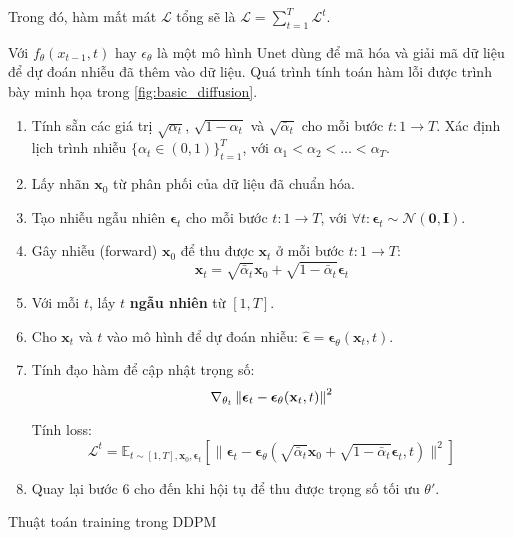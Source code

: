 Trong đó, hàm mất mát $\mathcal{L}$ tổng sẽ là  $\mathcal{L} = \sum_{t=1}^{T} \mathcal{L}^t$.

Với $f_{\theta}(x_{t-1}, t)$ hay $\epsilon_\theta$ là một mô hình Unet dùng để mã hóa và giải mã dữ liệu để dự đoán nhiễu đã thêm vào dữ liệu. Quá trình tính toán hàm lỗi được trình bày minh họa trong \autoref{fig:basic_diffusion}.


\begin{algorithm}[H]
	
	\setlength{\baselineskip}{10pt}
	\begin{enumerate}
		\vspace{5pt}
		\item Tính sẵn các giá trị $\sqrt{\alpha_t}$, $\sqrt{1 - \alpha_t}$ và $\sqrt{\bar{\alpha}_t}$ cho mỗi bước $t: 1 \rightarrow T$. Xác định lịch trình nhiễu $\{\alpha_t \in (0, 1)\}_{t=1}^T$, với $\alpha_1 < \alpha_2 < \dots < \alpha_T$.
		
		\item Lấy nhãn $\mathbf{x}_0$ từ phân phối của dữ liệu đã chuẩn hóa.
		
		\item Tạo nhiễu ngẫu nhiên $\boldsymbol{\epsilon}_t$ cho mỗi bước $t: 1 \rightarrow T$, với $\forall t: \boldsymbol{\epsilon}_t \sim \mathcal{N}(\mathbf{0}, \mathbf{I})$.
		
		\item Gây nhiễu (forward) $\mathbf{x}_0$ để thu được $\mathbf{x}_t$ ở mỗi bước $t: 1 \rightarrow T$:
		$$
		\mathbf{x}_t = \sqrt{\bar{\alpha}_t} \mathbf{x}_0 + \sqrt{1 - \bar{\alpha}_t} \boldsymbol{\epsilon}_t
		$$
		
		\item Với mỗi $t$, lấy $t$ \textbf{ngẫu nhiên} từ $[1, T]$.
		
		\item Cho $\mathbf{x}_t$ và $t$ vào mô hình để dự đoán nhiễu: $\hat{\boldsymbol{\epsilon}} = \boldsymbol{\epsilon}_\theta(\mathbf{x}_t, t)$.
		
		\item Tính đạo hàm để cập nhật trọng số:
		$$
		\nabla_{\theta_t} \left\| \boldsymbol{\epsilon}_t - \boldsymbol{\epsilon}_\theta(\mathbf{x}_t, t) \right\|^2
		$$
		
		Tính loss:
		$$
		\mathcal{L}^t = \mathbb{E}_{t \sim [1, T], \mathbf{x}_0, \boldsymbol{\epsilon}_t} \left[ \|\boldsymbol{\epsilon}_t - \boldsymbol{\epsilon}_\theta(\sqrt{\bar{\alpha}_t} \mathbf{x}_0 + \sqrt{1 - \bar{\alpha}_t} \boldsymbol{\epsilon}_t, t)\|^2 \right]
		$$
		
		\item Quay lại bước 6 cho đến khi hội tụ để thu được trọng số tối ưu $\theta'$.
	\end{enumerate}
	\caption{Thuật toán training trong DDPM}
	\label{alg:TrainingDDPM}
\end{algorithm}



